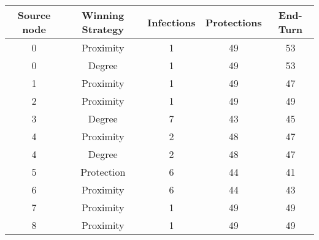\documentclass[results.tex]{subfiles}
\begin{document}
    \begin{center}
        \begin{tabular}{| c || c | c | c | c |}
            \hline
            {\bfseries Source node} & {\bfseries Winning Strategy} & {\bfseries Infections} & {\bfseries Protections}
            & {\bfseries End-Turn}
            \\  %
            \hline\hline
            0                       & Proximity                    & 1                      & 49                      & 53                   \\
            \hline
            0                       & Degree                       & 1                      & 49                      & 53                   \\
            \hline
            1                       & Proximity                    & 1                      & 49                      & 47                   \\
            \hline
            2                       & Proximity                    & 1                      & 49                      & 49                   \\
            \hline
            3                       & Degree                       & 7                      & 43                      & 45                   \\
            \hline
            4                       & Proximity                    & 2                      & 48                      & 47                   \\
            \hline
            4                       & Degree                       & 2                      & 48                      & 47                   \\
            \hline
            5                       & Protection                   & 6                      & 44                      & 41                   \\
            \hline
            6                       & Proximity                    & 6                      & 44                      & 43                   \\
            \hline
            7                       & Proximity                    & 1                      & 49                      & 49                   \\
            \hline
            8                       & Proximity                    & 1                      & 49                      & 49                   \\

\end{tabular}
\end{center}
\end{document}
